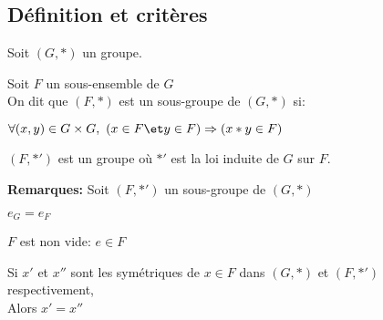 \documentclass[12pt,twoside,a4paper]{article}
\begin{document}
		\subsection{D\'efinition et crit\`eres}
			\begin{flushleft}
				Soit $(G,*)$ un groupe.
			\end{flushleft}
			\begin{defi}
				Soit $F$ un sous-ensemble de $G$\\
				On dit que $(F,*)$ est un sous-groupe de $(G,*)$ si:
				\begin{liste}
					\item $\forall (x,y)\in G\times G,\ (x\in F\et y\in F)\Rightarrow (x*y\in F)$
					\item $(F,*')$ est un groupe o\`u $*'$ est la loi induite de $G$ sur $F$.
				\end{liste}
			\end{defi}
			\begin{flushleft}
				\textbf{Remarques:} Soit $(F,*')$ un sous-groupe de $(G,*)$
				\begin{liste}
					\item $e_G=e_F$
					\item $F$ est non vide: $e\in F$
					\item Si $x'$ et $x''$ sont les sym\'etriques de $x\in F$ dans $(G,*)$ et $(F,*')$ respectivement,\\
						Alors $x'=x''$
				\end{liste}
			\end{flushleft}
\end{document}
